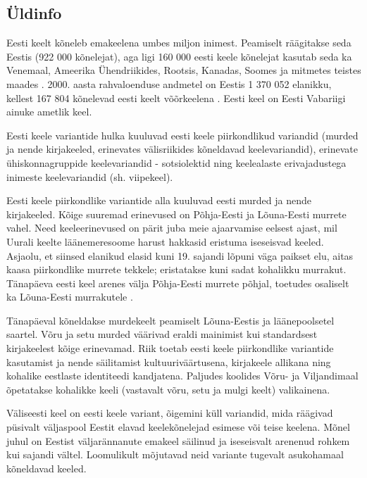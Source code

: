 \begin{multicols}{2}

\subsection{Üldinfo}

Eesti keelt kõneleb emakeelena umbes miljon inimest. 
Peamiselt räägitakse seda Eestis (922 000 kõnelejat), aga ligi 160 000 eesti keele kõnelejat kasutab seda ka Vene\-maal, Ameerika Ühendriikides, Rootsis, Kanadas, Soomes ja mitmetes teistes maades \cite{Stat1}. 
2000. aasta rahvaloenduse andmetel on Eestis 1 370 052 elanikku, kellest 167 804 kõnelevad eesti keelt võõrkeelena \cite{Stat2}. 
Eesti keel on Eesti Vabariigi ainuke ametlik keel.
 

Eesti keele variantide hulka kuuluvad eesti keele piirkondlikud variandid (murded ja nende kirjakeeled, erinevates välis\-riikides kõneldavad keelevariandid), erinevate ühiskonnagruppide keelevariandid - sotsiolektid ning keelealaste erivajadustega inimeste keelevariandid (sh. viipekeel).

Eesti keele piirkondlike variantide alla kuuluvad eesti murded ja nende kirjakeeled. 
Kõige suuremad erinevused on Põhja-Eesti ja Lõuna-Eesti murrete vahel.
Need keeleerinevused on pärit juba meie ajaarvamise eelsest ajast, mil Uurali keelte läänemeresoome harust hakkasid eristuma iseseisvad keeled.
Asja\-olu, et siinsed elanikud elasid kuni 19. sajandi lõpuni väga paikset elu, aitas kaasa piirkondlike murrete tekkele; eristatakse kuni sadat kohalikku murrakut.
Tänapäeva eesti keel arenes välja Põhja-Eesti murrete põhjal, toetudes osaliselt ka Lõuna-Eesti murrakutele \cite{KeeleStratEst}.

Tänapäeval kõneldakse murdekeelt peamiselt Lõuna-Eestis ja läänepoolsetel saartel. 
Võru ja setu murded väärivad eraldi mainimist kui standardsest kirjakeelest kõige eri\-nevamad. 
Riik toetab eesti keele piirkondlike variantide kasutamist ja nende säilitamist kultuuriväärtusena, kirjakeele allikana ning kohalike eestlaste identiteedi kandjatena. 
Paljudes koolides Võru- ja Viljandimaal õpetatakse kohalikke keeli (vastavalt võru, setu ja mulgi keelt) valikainena.

Väliseesti keel on eesti keele variant, õigemini küll variandid, mida räägivad püsivalt väljaspool Eestit elavad keelekõnelejad esimese või teise keelena. 
Mõnel juhul on Eestist väljarännanute emakeel säilinud ja iseseisvalt arenenud rohkem kui sajandi vältel.
Loomulikult mõjutavad neid variante tugevalt asukohamaal kõneldavad keeled. 


\end{multicols}
